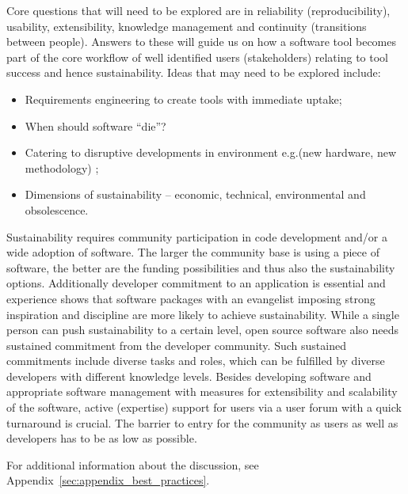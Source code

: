 Core questions that will need to be explored are in reliability (reproducibility), usability, extensibility, knowledge management and continuity (transitions between people). Answers to these will guide us on how a software tool becomes part of the core workflow of well identified users (stakeholders) relating to tool success and hence sustainability. 
Ideas  that may need to be explored include:
\begin{itemize}
\item Requirements engineering to create tools with immediate uptake;
\item When should software ``die''?
\item Catering to disruptive developments in environment e.g.(new hardware, new methodology) ;
\item Dimensions of sustainability -- economic, technical, environmental and
obsolescence. 
\end{itemize}

Sustainability requires community participation in code development and/or a wide adoption of software.
The larger the community base is using a piece of software, the better are the funding possibilities and thus also the sustainability options.
Additionally developer commitment to an application is essential and experience shows that software packages with an evangelist imposing strong inspiration and discipline are more likely to achieve sustainability.
While a single person can push sustainability to a certain level, open source software also needs sustained commitment from the developer community.
Such sustained commitments include diverse tasks and roles, which can be fulfilled by diverse developers with different knowledge levels.
Besides developing software and appropriate software management with measures for extensibility and scalability of the software, active (expertise) support for users via a user forum with a quick turnaround is crucial.
The barrier to entry for the community as users as well as developers has to be as low as possible.

For additional information about the discussion, see Appendix~\ref{sec:appendix_best_practices}.

